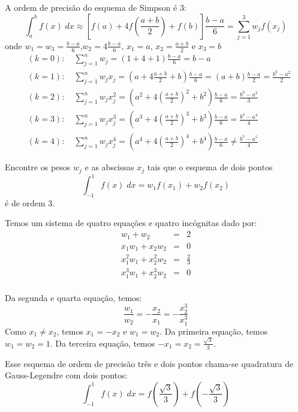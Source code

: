 \begin{ex}
A ordem de precisão do esquema de Simpson é 3:
$$\int_a^b f(x)\;dx \approx \left[f(a)+4f\left(\frac{a+b}{2}\right)+f(b)\right]\frac{b-a}{6}=\sum_{j=1}^3w_jf(x_j)$$
onde $w_1=w_3=\frac{b-a}{6}$,$w_2=4\frac{b-a}{6}$, $x_1=a$, $x_2=\frac{a+b}{2}$ e $x_3=b$
\begin{eqnarray*}
  &(k=0):\quad\sum_{j=1}^n w_j = (1+4+1)\frac{b-a}{6}=b-a\\
  &(k=1):\quad\sum_{j=1}^n w_jx_j = (a+4\frac{a+b}{2}+b)\frac{b-a}{6} = (a+b)\frac{b-a}{2} = \frac{b^2-a^2}{2}\\
  &(k=2):\quad\sum_{j=1}^n w_jx_j^2 = (a^2+4\left(\frac{a+b}{2}\right)^2+b^2)\frac{b-a}{6} = \frac{b^3-a^3}{3}\\
  &(k=3):\quad\sum_{j=1}^n w_jx_j^3 = (a^3+4\left(\frac{a+b}{2}\right)^3+b^3)\frac{b-a}{6}= \frac{b^4-a^4}{4}\\
  &(k=4):\quad\sum_{j=1}^n w_jx_j^4 = (a^4+4\left(\frac{a+b}{2}\right)^4+b^4)\frac{b-a}{6}\neq \frac{b^5-a^5}{4}
\end{eqnarray*}
\end{ex}

\begin{ex} 
Encontre os pesos $w_j$ e as abscissas $x_j$ tais que o esquema de dois pontos
$$\int_{-1}^1 f(x)\;dx = w_1f(x_1)+w_2f(x_2)$$
é de ordem 3.
\end{ex}
\begin{sol}
  Temos um sistema de quatro equações e quatro incógnitas dado por:
\begin{eqnarray*}
w_1+w_2&=&2\\
x_1w_1+x_2w_2&=&0\\
x_1^2w_1+x_2^2w_2&=&\frac{2}{3}\\
x_1^3w_1+x_2^3w_2&=&0\\
\end{eqnarray*}

Da segunda e quarta equação, temos:
$$\frac{w_1}{w_2}=-\frac{x_2}{x_1}=-\frac{x_2^3}{x_1^3}$$
Como $x_1\neq x_2$, temos $x_1=-x_2$ e $w_1=w_2$. Da primeira equação, temos $w_1=w_2=1$. Da terceira equação, temos $-x_1=x_2=\frac{\sqrt{3}}{3}$.

Esse esquema de ordem de precisão três e dois pontos chama-se quadratura de Gauss-Legendre com dois pontos:
$$\int_{-1}^1 f(x)\;dx = f\left(\frac{\sqrt{3}}{3}\right)+f\left(-\frac{\sqrt{3}}{3}\right)$$
\end{sol}

